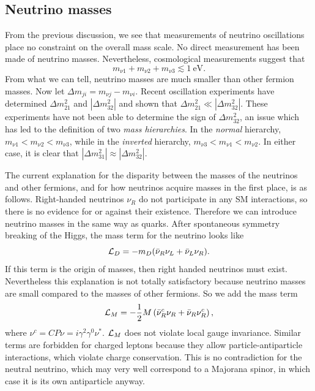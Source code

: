 \subsection{Neutrino masses}
From the previous discussion, we see that measurements of neutrino oscillations
place no constraint on the overall mass scale. No direct measurement has been
made of neutrino masses. Nevertheless, cosmological measurements suggest
that \cite{thomson_modern_2013}
\begin{equation}
  m_{\nu1}+m_{\nu2}+m_{\nu3}\lesssim1~\text{eV}. 
\end{equation}
From what we can tell,
neutrino masses are much smaller than other fermion masses. Now let
$\Delta m_{ji}=m_{\nu j}-m_{\nu i}$.
Recent oscillation experiments have determined $\Delta m_{21}^2$ and
$|\Delta m_{32}^2|$ and shown that $\Delta m_{21}^2\ll|\Delta m_{32}^2|$.
These experiments have not been able to determine the sign of
$\Delta m_{32}^2$, an issue which has led to the definition of two {\it mass
hierarchies}. 
In the {\it normal} hierarchy, $m_{\nu1}<m_{\nu2}<m_{\nu3}$,
while in the {\it inverted} hierarchy, $m_{\nu3}<m_{\nu1}<m_{\nu2}$. In
either case, it is clear that $|\Delta m_{31}^2|\approx|\Delta m_{32}^2|$.

The current explanation for the disparity between the masses of the neutrinos
and other fermions, and for how neutrinos acquire masses in the
first place, is as follows. Right-handed neutrinos $\nu_R$ do not
participate in any SM interactions, so
there is no evidence for or against their existence. Therefore we can introduce
neutrino masses in the same way as quarks. After spontaneous symmetry breaking
of the Higgs, the mass term for the neutrino looks like
\begin{equation}
  \mathcal{L}_D=-m_D(\bar{\nu}_R\nu_L+\bar{\nu}_L\nu_R).
\end{equation}
If this term is the origin of masses, then right handed neutrinos must exist.
Nevertheless this explanation is not totally satisfactory because neutrino
masses are small compared to the masses of other fermions. So we add
the mass term
\begin{equation}
  \mathcal{L}_M=-\frac{1}{2}M\left(\bar{\nu}^c_R\nu_R+\bar{\nu}_R\nu^c_R\right),
\end{equation}
where $\nu^c=CP\nu=i\gamma^2\gamma^0\nu^*$. $\mathcal{L}_M$ does not violate local
gauge invariance. Similar terms are forbidden for charged leptons because
they allow particle-antiparticle interactions, which violate charge
conservation. This is no contradiction for the neutral neutrino, which may
very well correspond to a Majorana spinor, in which case it is its own
antiparticle anyway.

